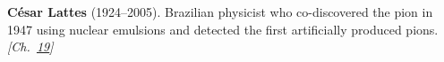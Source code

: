 \textbf{César Lattes} (1924–2005). Brazilian physicist who co-discovered the pion in 1947 using nuclear emulsions and detected the first artificially produced pions. \emph{[Ch.~\hyperref[ch:cosmicraymuons]{19}]}


